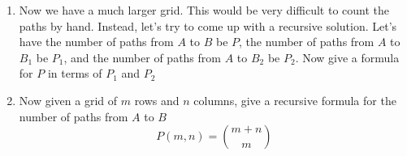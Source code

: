 \documentclass[basic, header]{nosvagor-notes}
\begin{document}
\begin{enumerate}
\begin{enumerate}
      \item Now we have a much larger grid. This would be very difficult to
        count the paths by hand. Instead, let's try to come up with a recursive
        solution. Let's have the number of paths from $A$ to $B$ be $P$, the
        number of paths from $A$ to $B_1$ be $P_1$, and the number of paths
        from $A$ to $B_2$ be $P_2$. Now give a formula for $P$ in terms of
        $P_1$ and $P_2$

        \begin{center}
        \end{center}

      \item Now given a grid of $m$ rows and $n$ columns, give a recursive
        formula for the number of paths from $A$ to $B$
        \[%
          P(m,n) = {m+n \choose m}
        \]%



    \end{enumerate}








\end{enumerate}
\end{document}
